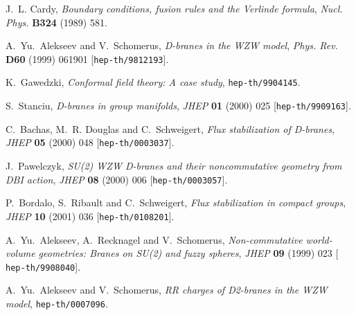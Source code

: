 \documentclass[12pt,a4paper]{article}
\begin{document}
\providecommand{\href}[2]{#2}\begingroup\raggedright\begin{thebibliography}{10}

J.~L. Cardy, {\it Boundary conditions, fusion rules and the {Verlinde}
  formula},  {\em Nucl. Phys.} {\bf B324} (1989) 581.

A.~Yu.~Alekseev and V.~Schomerus, {\it {D-branes} in the {WZW} model},  {\em
  Phys. Rev.} {\bf D60} (1999) 061901
  [\href{http://arXiv.org/abs/hep-th/9812193}{{\tt hep-th/9812193}}].

K.~Gawedzki, {\it Conformal field theory: {A} case study},
  \href{http://arXiv.org/abs/hep-th/9904145}{{\tt hep-th/9904145}}.

S.~Stanciu, {\it D-branes in group manifolds},  {\em JHEP} {\bf 01} (2000) 025
  [\href{http://arXiv.org/abs/hep-th/9909163}{{\tt hep-th/9909163}}].

C.~Bachas, M.~R. Douglas and C.~Schweigert, {\it Flux stabilization of
  {D-branes}},  {\em JHEP} {\bf 05} (2000) 048
  [\href{http://arXiv.org/abs/hep-th/0003037}{{\tt hep-th/0003037}}].

J.~Pawelczyk, {\it {SU(2)} {WZW} {D-branes} and their noncommutative geometry
  from {DBI} action},  {\em JHEP} {\bf 08} (2000) 006
  [\href{http://arXiv.org/abs/hep-th/0003057}{{\tt hep-th/0003057}}].

P.~Bordalo, S.~Ribault and C.~Schweigert, {\it Flux stabilization in compact
  groups},  {\em JHEP} {\bf 10} (2001) 036
  [\href{http://arXiv.org/abs/hep-th/0108201}{{\tt hep-th/0108201}}].

A.~Yu.~Alekseev, A.~Recknagel and V.~Schomerus, {\it Non-commutative
  world-volume geometries: {Branes} on {SU(2)} and fuzzy spheres},  {\em JHEP}
  {\bf 09} (1999) 023 [\href{http://arXiv.org/abs/hep-th/9908040}{{\tt
  hep-th/9908040}}].

A.~Yu.~Alekseev and V.~Schomerus, {\it {RR} charges of {D2-branes} in the {WZW}
  model},  \href{http://arXiv.org/abs/hep-th/0007096}{{\tt hep-th/0007096}}.


\end{thebibliography}
\end{document}
